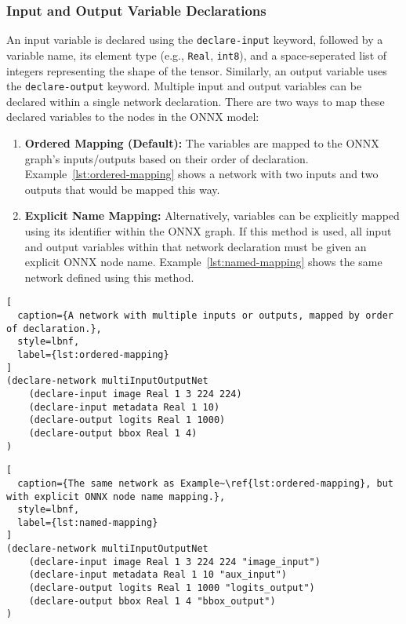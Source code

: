 \subsubsection*{Input and Output Variable Declarations}
An input variable is declared using the \texttt{declare-input} keyword, followed by a variable name, its element type (e.g., \texttt{Real}, \texttt{int8}), 
and a space-seperated list of integers representing the shape of the tensor. Similarly, an output variable uses the \texttt{declare-output} keyword. Multiple 
input and output variables can be declared within a single network declaration. There are two ways to map these declared variables to the nodes in the ONNX model:
\begin{enumerate}
    \item \textbf{Ordered Mapping (Default):} The variables are mapped to the ONNX graph's inputs/outputs based on their order of declaration. Example~\ref{lst:ordered-mapping} 
        shows a network with two inputs and two outputs that would be mapped this way.
    \item \textbf{Explicit Name Mapping:} Alternatively, variables can be explicitly mapped using its identifier within the ONNX graph. If this method is used, all input and output 
        variables within that network declaration must be given an explicit ONNX node name. Example~\ref{lst:named-mapping} shows the same network defined using this method.
\end{enumerate}

\begin{lstlisting}[
  caption={A network with multiple inputs or outputs, mapped by order of declaration.},
  style=lbnf,
  label={lst:ordered-mapping}
]
(declare-network multiInputOutputNet
    (declare-input image Real 1 3 224 224)
    (declare-input metadata Real 1 10)
    (declare-output logits Real 1 1000)
    (declare-output bbox Real 1 4)
)
\end{lstlisting}

\begin{lstlisting}[
  caption={The same network as Example~\ref{lst:ordered-mapping}, but with explicit ONNX node name mapping.},
  style=lbnf,
  label={lst:named-mapping}
]
(declare-network multiInputOutputNet
    (declare-input image Real 1 3 224 224 "image_input")
    (declare-input metadata Real 1 10 "aux_input")
    (declare-output logits Real 1 1000 "logits_output")
    (declare-output bbox Real 1 4 "bbox_output")
)
\end{lstlisting}

